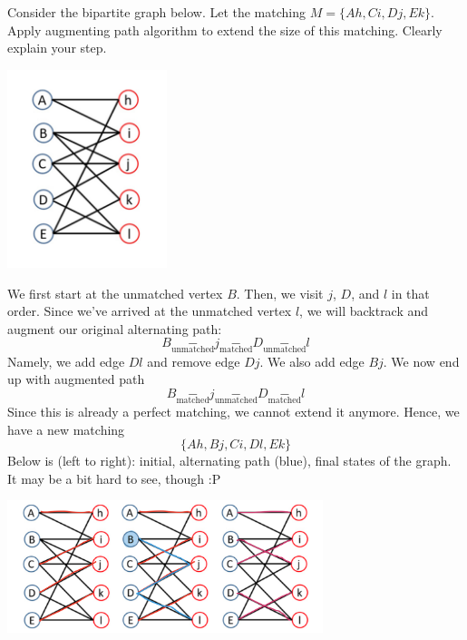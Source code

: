 \question Consider the bipartite graph below. Let the matching
\(M=\{A h, C i, D j, E k\}\). Apply augmenting path algorithm to
extend the size of this matching. Clearly explain your step.

\begin{center}
  \includegraphics[width=0.35\textwidth]{figures/p2-graph}
\end{center}

\begin{solution}
  We first start at the unmatched vertex \(B\). Then, we visit
  \(j\), \(D\), and \(l\) in that order. Since we've arrived at
  the unmatched vertex \(l\), we will backtrack and augment our
  original alternating path:
  \[
    B \underset{\text{unmatched}}{-} j \underset{\text{matched}}
    {-} D \underset{\text{unmatched}}{-} l
  \]
  Namely, we add edge \(Dl\) and remove edge \(Dj\).
  We also add edge \(Bj\). We now end up with augmented path
  \[
    B \underset{\text{matched}}{-} j \underset{\text{unmatched}}
    {-} D \underset{\text{matched}}{-} l
  \]
  Since this is already a perfect matching, we cannot extend it
  anymore. Hence, we have a new matching 
  \[
    \{Ah, Bj, Ci, Dl, Ek\}
  \]
  Below is (left to right): initial, alternating path (blue),
  final states of the graph. It may be a bit hard to see, though
  :P

  \begin{center}
    \includegraphics[width=0.69\textwidth]{figures/p2-soln}
  \end{center}
\end{solution}
